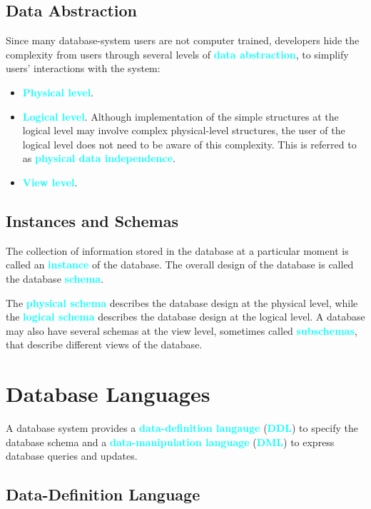 \documentclass{Beautybook-EN}
\newcommand{\textcy}[1]{\textbf{\textcolor{cyan}{#1}}}
\begin{document}
\subsection{Data Abstraction}

Since many database-system users are not computer trained, developers hide the complexity from users through several levels of \textcy{data abstraction}, to simplify users' interactions with the system:
\begin{itemize}
    \item\textcy{Physical level}.
    \item\textcy{Logical level}. Although implementation of the simple structures at the logical level may involve complex physical-level structures, the user of the logical level does not need to be aware of this complexity. This is referred to as \textcy{physical data independence}.
    \item\textcy{View level}.
\end{itemize}

\subsection{Instances and Schemas}

The collection of information stored in the database at a particular moment is called an \textcy{instance} of the database. The overall design of the database is called the database \textcy{schema}.

The \textcy{physical schema} describes the database design at the physical level, while the \textcy{logical schema} describes the database design at the logical level. A database may also have several schemas at the view level, sometimes called \textcy{subschemas}, that describe different views of the database.

\section{Database Languages}

A database system provides a \textcy{data-definition langauge} (\textcy{DDL}) to specify the database schema and a \textcy{data-manipulation language} (\textcy{DML}) to express database queries and updates.

\subsection{Data-Definition Language}
\end{document}
